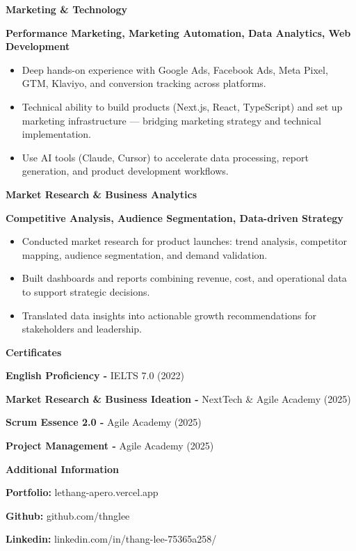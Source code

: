 \documentclass[11pt]{article}
\begin{document}
\vspace{8pt}

\textbf{Marketing \& Technology}

\textbf{Performance Marketing, Marketing Automation, Data Analytics, Web Development}
\begin{itemize}[noitemsep, topsep=0pt]
    \item Deep hands-on experience with Google Ads, Facebook Ads, Meta Pixel, GTM, Klaviyo, and conversion tracking across platforms.
    \item Technical ability to build products (Next.js, React, TypeScript) and set up marketing infrastructure --- bridging marketing strategy and technical implementation.
    \item Use AI tools (Claude, Cursor) to accelerate data processing, report generation, and product development workflows.
\end{itemize}

\vspace{8pt}

\textbf{Market Research \& Business Analytics}

\textbf{Competitive Analysis, Audience Segmentation, Data-driven Strategy}
\begin{itemize}[noitemsep, topsep=0pt]
    \item Conducted market research for product launches: trend analysis, competitor mapping, audience segmentation, and demand validation.
    \item Built dashboards and reports combining revenue, cost, and operational data to support strategic decisions.
    \item Translated data insights into actionable growth recommendations for stakeholders and leadership.
\end{itemize}

\vspace{12pt}


\begin{center}
    \textbf{Certificates}
\end{center}

\textbf{English Proficiency -} IELTS 7.0 (2022)

\textbf{Market Research \& Business Ideation -} NextTech \& Agile Academy (2025)

\textbf{Scrum Essence 2.0 -} Agile Academy (2025)

\textbf{Project Management -} Agile Academy (2025)

\vspace{12pt}
\begin{center}
    \textbf{Additional Information}
\end{center}
\textbf{Portfolio:} lethang-apero.vercel.app

\textbf{Github:} github.com/thnglee

\textbf{Linkedin:} linkedin.com/in/thang-lee-75365a258/
\end{document}
